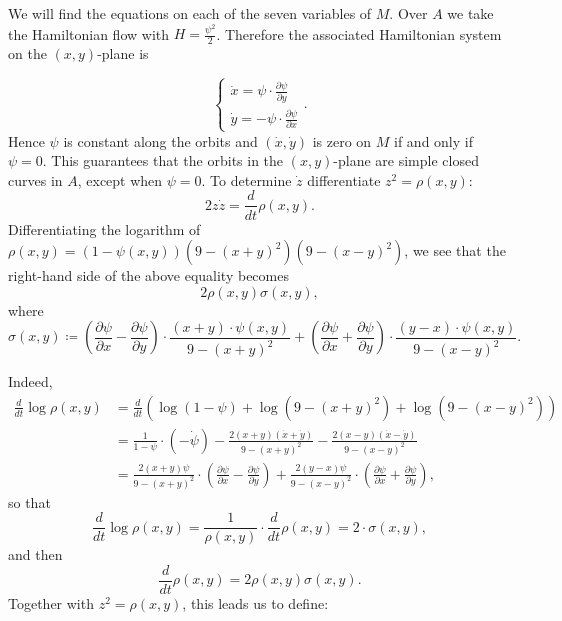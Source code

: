\documentclass[11pt,reqno]{amsart}
\theoremstyle{plain}
\theoremstyle{definition}
\theoremstyle{remark}
\theoremstyle{plain}
\numberwithin{equation}{section}
\begin{document}
							We will find the equations on each of the seven variables of $M$. Over $A$ we take the Hamiltonian flow with $H=\frac{\psi^{2}}{2}$. Therefore the associated Hamiltonian system on the \((x,y)\)-plane is
							
							
							\begin{equation} \label{def: eqs de Hamilton no anel}
								\begin{cases}
									\dot{x}=\psi\cdot \frac{\partial \psi}{\partial y}\\
									\dot{y}=-\psi\cdot \frac{\partial \psi}{\partial x}
								\end{cases}.
							\end{equation} 
							Hence $\psi$ is constant along the orbits and $(\dot{x},\dot{y})$ is zero on $M$ if and only if $\psi=0$. This guarantees that the orbits in the $(x,y)$-plane are simple closed curves in $A$, except when $\psi=0$. To determine $\dot{z}$ differentiate $z^{2}=\rho(x,y)$: 
							$$2z\dot{z}=\frac{d}{dt}\rho(x,y).$$
							Differentiating the logarithm of $\rho(x,y)=(1-\psi(x,y))(9-(x+y)^{2})(9-(x-y)^{2})$, we see that the right-hand side of the above equality becomes $$2\rho(x,y)\sigma(x,y),$$ where \begin{equation}\label{def: sigma}\sigma(x,y)\coloneqq \left(\frac{\partial \psi}{\partial x}-\frac{\partial \psi}{\partial y}\right)\cdot \frac{(x+y)\cdot \psi(x,y)}{9-(x+y)^{2}}+\left(\frac{\partial \psi}{\partial x}+\frac{\partial \psi}{\partial y}\right)\cdot \frac{(y-x)\cdot \psi(x,y)}{9-(x-y)^{2}}.\end{equation}
							
							Indeed, \begin{align*}
								\frac{d}{dt} \log{\rho(x,y)}&= \frac{d}{dt} \left(\log{(1-\psi)}+\log{(9-(x+y)^{2})}+\log{(9-(x-y)^{2})}\right)\\&=\frac{1}{1-\psi}\cdot \left(-\dot{\psi}\right)-\frac{2(x+y)(\dot{x}+\dot{y})}{9-(x+y)^{2}}-\frac{2(x-y)(\dot{x}-\dot{y})}{9-(x-y)^{2}}\\&=\frac{2(x+y)\psi}{9-(x+y)^{2}}\cdot \left( \frac{\partial \psi}{\partial x}- \frac{\partial \psi}{\partial y}\right)+\frac{2(y-x)\psi}{9-(x-y)^{2}}\cdot \left( \frac{\partial \psi}{\partial x}+\frac{\partial \psi}{\partial y}\right),
							\end{align*} so that \begin{equation}\label{eq: sigma log de rho} \frac{d}{dt}\log{\rho(x,y)}=\frac{1}{\rho(x,y)}\cdot \frac{d}{dt}\rho(x,y)=2\cdot \sigma(x,y),\end{equation} and then $$\frac{d}{dt}\rho(x,y)=2\rho(x,y)\sigma(x,y).$$ Together with $z^{2}=\rho(x,y)$, this leads us to define: 
							
\end{document}
